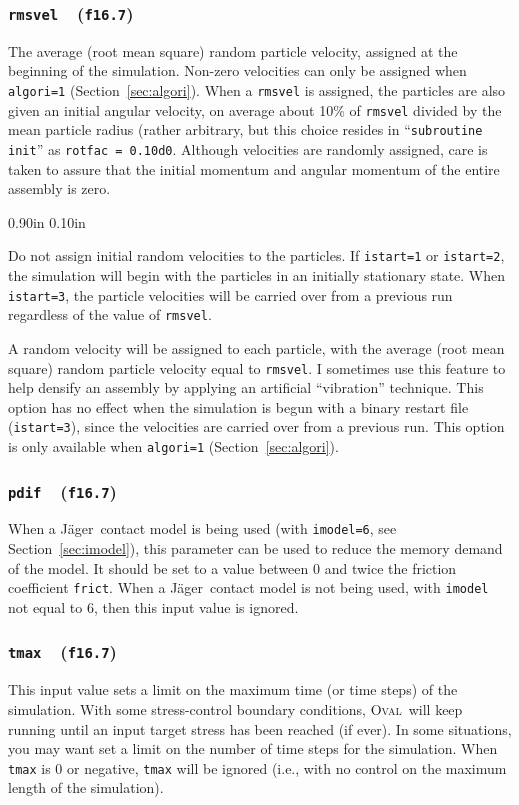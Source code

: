 \documentclass[letterpaper,11pt]{article}
\newcommand{\Oval}{\textsc{Oval}}
\newcommand{\Var}[2]{\texttt{#1}\ \  (\texttt{#2})}
\newlength{\Labelwidth}
\newcommand{\Entrylabel}[1]{\makebox[\Labelwidth][r]{\texttt{#1}}}
\newenvironment{Options}
{\begin{list}{}{%
\renewcommand{\makelabel}{\Entrylabel}%
\setlength{\leftmargin} {0.90in}%
\setlength{\rightmargin}{0.00in}%
\setlength{\labelsep}   {0.10in}%
\setlength{\labelwidth} {\Labelwidth}%
}}
{\end{list}}
\begin{document}
\subsubsection[\texttt{rmsvel}]{\Var{rmsvel}{f16.7}}\label{sec:rmsvel}
The average (root mean square) random particle velocity, assigned
at the beginning of the simulation.  
Non-zero velocities can only be assigned when \texttt{algori=1}
(Section~\ref{sec:algori}).
When a \texttt{rmsvel} is assigned, the particles are also given
an initial angular velocity, on average about 10\% of \texttt{rmsvel}
divided by the mean particle radius (rather arbitrary, but this
choice resides in ``\texttt{subroutine init}'' as 
\texttt{rotfac = 0.10d0}.
Although velocities are randomly assigned, care is taken to
assure that the initial momentum and angular momentum of the entire
assembly is zero.
\begin{Options}
\item[rmsvel=0.]
Do not assign initial random velocities to the particles.
If \texttt{istart=1} or \texttt{istart=2}, the simulation will
begin with the particles in an initially stationary state.
When \texttt{istart=3}, the particle velocities will be carried over
from a previous run regardless of the
value of \texttt{rmsvel}.
\item[rmsvel>0.]
A random velocity will be assigned to each particle,
with the average (root mean square) random particle velocity
equal to \texttt{rmsvel}.
I sometimes use this feature to help densify an assembly by applying an
artificial ``vibration'' technique.
This option has no effect when the simulation is begun with a binary
restart file (\texttt{istart=3}), since the velocities are carried over
from a previous run.
This option is only available when \texttt{algori=1}
(Section~\ref{sec:algori}).
\end{Options}
%
\subsubsection[\texttt{pdif}]{\Var{pdif}{f16.7}}\label{sec:pdif}
When a J\"{a}ger\ contact model is being used 
(with \texttt{imodel=6}, see Section~\ref{sec:imodel}),
this parameter can be used to reduce the memory demand of the model.
It should be set to a value between 0 and twice the friction
coefficient \texttt{frict}.
When a  J\"{a}ger\ contact model is not being used,
with \texttt{imodel} not equal to 6, then this input value is ignored.
%
\subsubsection[\texttt{tmax}]{\Var{tmax}{f16.7}}\label{sec:tmax}
This input value sets a limit on the maximum time (or time steps) of
the simulation.
With some stress-control boundary conditions, \Oval\ will keep running
until an input target stress has been reached (if ever).
In some situations, you may want set a limit on the number of
time steps for the simulation.
When \texttt{tmax} is 0 or negative, \texttt{tmax} will be ignored
(i.e., with no control on the maximum length of the simulation).
%
\end{document}
